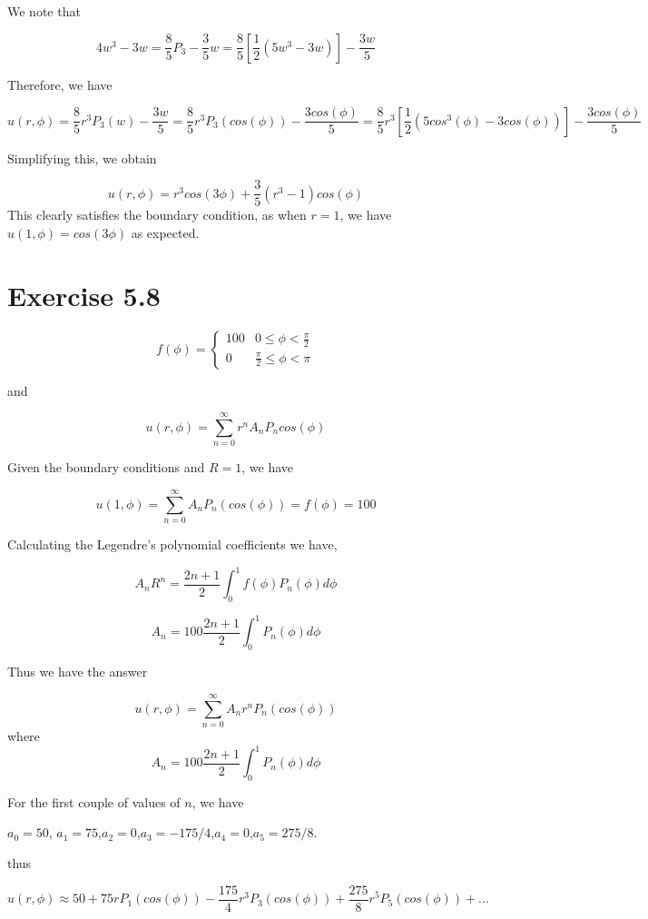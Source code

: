 \documentclass{article}
\begin{document}
We note that

$$4w^3-3w = \frac{8}{5} P_3 - \frac{3}{5} w = \frac{8}{5} \left[ \frac{1}{2} \left(5w^3-3w\right)\right]-\frac{3w}{5}$$

Therefore, we have

$$u(r,\phi) = \frac{8}{5} r^3 P_3(w) - \frac{3w}{5} = \frac{8}{5} r^3 P_3(cos(\phi)) - \frac{3cos(\phi)}{5} = \frac{8}{5}r^3 \left[ \frac{1}{2} \left( 5cos^3(\phi)-3cos(\phi)\right)\right] - \frac{3cos(\phi)}{5}$$

Simplifying this, we obtain

$$u(r,\phi) = r^3cos(3\phi) + \frac{3}{5} (r^3-1) cos(\phi)$$
This clearly satisfies the boundary condition, as when $r=1$, we have $u(1,\phi) = cos(3\phi)$ as expected. 


\section*{Exercise 5.8}

\[ f(\phi) = \begin{cases}
      100 & 0\leq \phi < \frac{\pi}{2} \\
      0 & \frac{\pi}{2} \leq \phi < \pi
   \end{cases}
\]

and


$$u(r,\phi) = \sum_{n=0}^{\infty} r^n A_n P_n cos(\phi)$$

Given the boundary conditions and $R=1$, we have

$$u(1,\phi) = \sum_{n=0}^{\infty} A_n P_n(cos(\phi)) = f(\phi) = 100$$

Calculating the Legendre's polynomial coefficients we have,

$$A_nR^n = \frac{2n+1}{2} \int_0^{1} f(\phi) P_n(\phi) d\phi$$

$$A_n = 100 \frac{2n+1}{2} \int_0^{1} P_n(\phi) d\phi$$

Thus we have the answer

$$u(r,\phi) = \sum_{n=0}^{\infty} A_n r^n P_n(cos(\phi))$$
where
$$A_n = 100 \frac{2n+1}{2} \int_0^{1} P_n(\phi) d\phi$$

For the first couple of values of $n$, we have

$a_0 = 50$, $a_1 = 75$,$a_2 = 0$,$a_3 = -175/4$,$a_4 = 0$,$a_5 = 275/8$.
    
thus

$$u(r,\phi) \approx 50 + 75 r P_1(cos(\phi)) - \frac{175}{4} r^3 P_3(cos(\phi)) + \frac{275}{8} r^5 P_5(cos(\phi)) + ...$$
\end{document}
